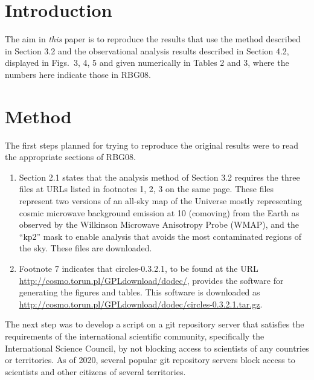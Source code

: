 

\abstract{\articleABSTRACT} %


\section{Introduction}

The aim in \emph{this} paper is to reproduce the results that use the
method described in Section 3.2 and the observational
analysis results described in Section 4.2, displayed in Figs.~3, 4, 5
and given numerically in Tables 2 and 3, where the numbers here
indicate those in RBG08.

\section{Method}

The first steps planned for trying to reproduce the original results
were to read the appropriate sections of RBG08.
\begin{enumerate}
\item
  Section 2.1\supercite{RBG08} states that the analysis method of Section 3.2 requires
  the three files at URLs listed in footnotes 1, 2, 3 on the same page. These files
  represent two versions of an all-sky map of the Universe mostly representing cosmic microwave background
  emission at 10{\hGpc} (comoving) from the Earth as observed by
  the Wilkinson Microwave Anisotropy Probe (WMAP)\supercite{WMAP5Hinshaw}, and
  the ``kp2'' mask to enable analysis that avoids the most contaminated regions of
  the sky. These files are downloaded.
\item
  Footnote 7\supercite{RBG08} indicates that {\sc circles-0.3.2.1}, to be found at
  the URL \url{http://cosmo.torun.pl/GPLdownload/dodec/}, provides the software
  for generating the figures and tables. This software is downloaded as
  \url{http://cosmo.torun.pl/GPLdownload/dodec/circles-0.3.2.1.tar.gz}.
\end{enumerate}

The next step was to develop a script on a {\sc git} repository server
that satisfies the requirements of the international scientific community,
specifically the International Science Council\supercite{ISCFreedoms}, by
not blocking access to scientists of any countries or territories.
As of 2020, several popular {\sc git} repository servers block access to
scientists and other citizens of several territories\supercite{Github2020}.


